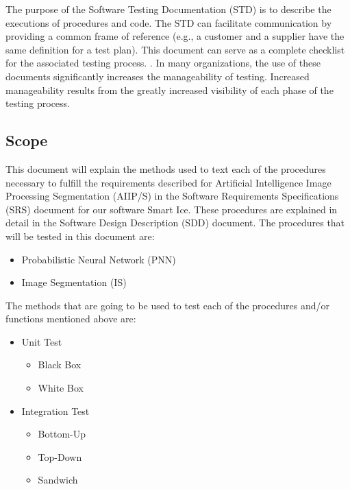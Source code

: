 \documentclass[12pt]{article}
\begin{document}
 The purpose of the Software Testing Documentation (STD) is to describe the executions of procedures and code. The STD can facilitate communication by providing a common frame of reference (e.g., a customer and a supplier have the same definition for a test plan).  This document can serve as a complete checklist for the associated testing process. . In many organizations, the use of these documents significantly increases the manageability of testing. Increased manageability results from the greatly increased visibility of each phase of the testing process.



\subsection{Scope}

This document will explain the methods used to text each of the procedures necessary to fulfill the requirements described for Artificial Intelligence Image Processing Segmentation (AIIP/S) in the Software Requirements Specifications (SRS) document for our software Smart Ice. These procedures are explained in detail in the Software Design Description (SDD) document. The procedures that will be tested in this document are:

\begin{itemize}
  \item Probabilistic Neural Network (PNN)
  \item Image Segmentation (IS)
\end{itemize}

The methods that are going to be used to test each of the procedures and/or functions mentioned above are:
\begin{itemize}
  \item Unit Test
    \begin{itemize}
  \item Black Box
  \item White Box
    \end{itemize}
  \item Integration Test
   \begin{itemize}
  \item Bottom-Up
  \item Top-Down
  \item Sandwich
    \end{itemize}
\end{itemize}
\end{document}
